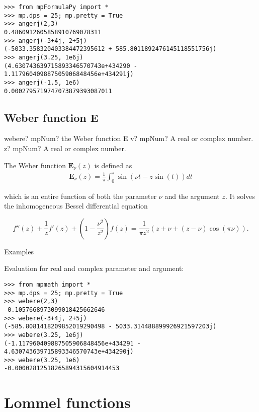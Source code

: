 \begin{lstlisting}
>>> from mpFormulaPy import *
>>> mp.dps = 25; mp.pretty = True
>>> angerj(2,3)
0.4860912605858910769078311
>>> angerj(-3+4j, 2+5j)
(-5033.358320403384472395612 + 585.8011892476145118551756j)
>>> angerj(3.25, 1e6j)
(4.630743639715893346570743e+434290 - 1.117960409887505906848456e+434291j)
>>> angerj(-1.5, 1e6)
0.0002795719747073879393087011
\end{lstlisting}



\subsection{Weber function E}

\begin{mpFunctionsExtract}
	\mpFunctionTwo
	{webere? mpNum? the Weber function E}
	{v? mpNum? A real or complex number.}
	{z? mpNum? A real or complex number.}	
\end{mpFunctionsExtract}

\vpara
The Weber function $\textbf{E}_{\nu}(z)$ is defined as
\begin{eqnarray}
\textbf{E}_{\nu}(z) = \frac{1}{\pi} \int_0^{\pi} \sin(\nu t - z \sin(t)) dt
\end{eqnarray}

which is an entire function of both the parameter $\nu$ and the argument $z$. It solves the inhomogeneous Bessel differential equation

\begin{equation}
f''(z)+\frac{1}{z} f'(z) + \left(1-\frac{\nu^2}{z^2} \right)f(z) = \frac{1}{\pi z^2} (z+\nu+(z-\nu) \cos(\pi\nu)).
\end{equation}


Examples

Evaluation for real and complex parameter and argument:

\begin{lstlisting}
>>> from mpmath import *
>>> mp.dps = 25; mp.pretty = True
>>> webere(2,3)
-0.1057668973099018425662646
>>> webere(-3+4j, 2+5j)
(-585.8081418209852019290498 - 5033.314488899926921597203j)
>>> webere(3.25, 1e6j)
(-1.117960409887505906848456e+434291 - 4.630743639715893346570743e+434290j)
>>> webere(3.25, 1e6)
-0.00002812518265894315604914453
\end{lstlisting}


\newpage
\section{Lommel functions}


